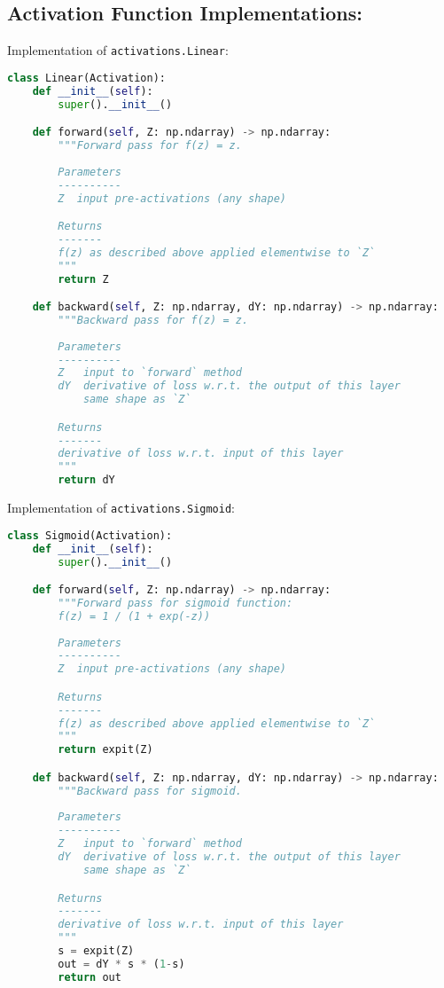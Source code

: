 \subsection{Activation Function Implementations:}

Implementation of \texttt{activations.Linear}:

\begin{lstlisting}[language=Python]
class Linear(Activation):
    def __init__(self):
        super().__init__()

    def forward(self, Z: np.ndarray) -> np.ndarray:
        """Forward pass for f(z) = z.
        
        Parameters
        ----------
        Z  input pre-activations (any shape)

        Returns
        -------
        f(z) as described above applied elementwise to `Z`
        """
        return Z

    def backward(self, Z: np.ndarray, dY: np.ndarray) -> np.ndarray:
        """Backward pass for f(z) = z.
        
        Parameters
        ----------
        Z   input to `forward` method
        dY  derivative of loss w.r.t. the output of this layer
            same shape as `Z`

        Returns
        -------
        derivative of loss w.r.t. input of this layer
        """
        return dY

\end{lstlisting}

Implementation of \texttt{activations.Sigmoid}:

\begin{lstlisting}[language=Python]
class Sigmoid(Activation):
    def __init__(self):
        super().__init__()

    def forward(self, Z: np.ndarray) -> np.ndarray:
        """Forward pass for sigmoid function:
        f(z) = 1 / (1 + exp(-z))
        
        Parameters
        ----------
        Z  input pre-activations (any shape)

        Returns
        -------
        f(z) as described above applied elementwise to `Z`
        """
        return expit(Z)

    def backward(self, Z: np.ndarray, dY: np.ndarray) -> np.ndarray:
        """Backward pass for sigmoid.
        
        Parameters
        ----------
        Z   input to `forward` method
        dY  derivative of loss w.r.t. the output of this layer
            same shape as `Z`

        Returns
        -------
        derivative of loss w.r.t. input of this layer
        """
        s = expit(Z)
        out = dY * s * (1-s)
        return out

\end{lstlisting}

